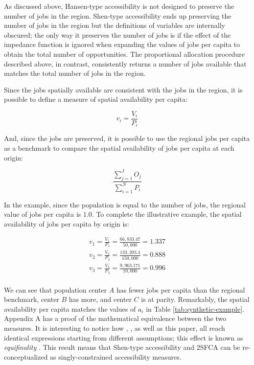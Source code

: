 \documentclass[]{elsarticle} %
\begin{document}
As discussed above, Hansen-type accessibility is not designed to
preserve the number of jobs in the region. Shen-type accessibility ends
up preserving the number of jobs in the region but the definitions of
variables are internally obscured; the only way it preserves the number
of jobs is if the effect of the impedance function is ignored when
expanding the values of jobs per capita to obtain the total number of
opportunities. The proportional allocation procedure described above, in
contrast, consistently returns a number of jobs available that matches
the total number of jobs in the region.

Since the jobs spatially available are consistent with the jobs in the
region, it is possible to define a measure of spatial availability per
capita:

\begin{equation}
\label{eq:SA-per-capita}
v_i = \frac{V_i}{P_i}
\end{equation}

And, since the jobs are preserved, it is possible to use the regional
jobs per capita as a benchmark to compare the spatial availability of
jobs per capita at each origin:

\begin{equation}
\label{eq:Regional-jobs-per-capita}
\frac{\sum_{j=1}^J O_j}{\sum_{i=1}^N P_i}
\end{equation}

In the example, since the population is equal to the number of jobs, the
regional value of jobs per capita is \(1.0\). To complete the
illustrative example, the spatial availability of jobs per capita by
origin is:

\begin{equation}
\label{eq:SA-per-capita-2populations}
\begin{array}{l}
v_{1} = \frac{V_1}{P_1} =  \frac{66,833.47}{50,000} = 1.337\\
v_{2} =  \frac{V_{2}}{P_2} =  \frac{133,203.4}{150,000} = 0.888\\
v_{3} =  \frac{V_{3}}{P_3} =  \frac{9,963.171}{10,000} = 0.996\\
\end{array}
\end{equation}

We can see that population center \(A\) has fewer jobs per capita than
the regional benchmark, center \(B\) has more, and center \(C\) is at
parity. Remarkably, the spatial availability per capita matches the
values of \(a_i\) in Table \ref{tab:synthetic-example}. Appendix A has a
proof of the mathematical equivalence between the two measures. It is
interesting to notice how \citet{weibull_axiomatic_1976},
\citet{shen1998}, as well as this paper, all reach identical expressions
starting from different assumptions; this effect is known as
\emph{equifinality}
\citetext{\citealp[see][p.~333]{ortuzar_2011_modelling}; \citealp[and][]{williams_hall_1981}}.
This result means that Shen-type accessibility and 2SFCA can be
re-conceptualized as singly-constrained accessibility measures.
\end{document}
